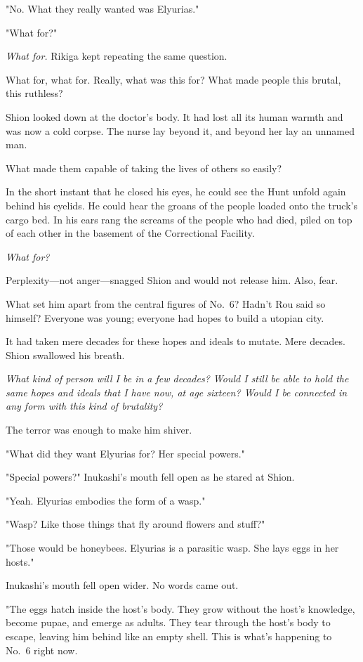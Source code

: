 "No. What they really wanted was Elyurias."

"What for?"

\emph{What for.} Rikiga kept repeating the same question.

What for, what for. Really, what was this for? What made people this
brutal, this ruthless?

Shion looked down at the doctor's body. It had lost all its human warmth
and was now a cold corpse. The nurse lay beyond it, and beyond her lay
an unnamed man.

What made them capable of taking the lives of others so easily?

In the short instant that he closed his eyes, he could see the Hunt
unfold again behind his eyelids. He could hear the groans of the people
loaded onto the truck's cargo bed. In his ears rang the screams of the
people who had died, piled on top of each other in the basement of the
Correctional Facility.

\emph{What for?}

Perplexity---not anger---snagged Shion and would not release him. Also,
fear.

What set him apart from the central figures of No.~6? Hadn't Rou said so
himself? Everyone was young; everyone had hopes to build a utopian city.

It had taken mere decades for these hopes and ideals to mutate. Mere
decades. Shion swallowed his breath.

\emph{What kind of person will I be in a few decades? Would I still be able to
hold the same hopes and ideals that I have now, at age sixteen? Would I
be connected in any form with this kind of brutality?}

The terror was enough to make him shiver.

"What did they want Elyurias for? Her special powers."

"Special powers?" Inukashi's mouth fell open as he stared at Shion.

"Yeah. Elyurias embodies the form of a wasp."

"Wasp? Like those things that fly around flowers and stuff?"

"Those would be honeybees. Elyurias is a parasitic wasp. She lays eggs
in her hosts."

Inukashi's mouth fell open wider. No words came out.

"The eggs hatch inside the host's body. They grow without the host's
knowledge, become pupae, and emerge as adults. They tear through the
host's body to escape, leaving him behind like an empty shell. This is
what's happening to No.~6 right now.

